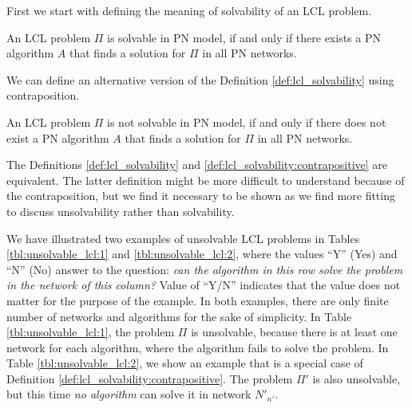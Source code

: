 First we start with defining the meaning of solvability of an LCL problem.
\begin{definition} \label{def:lcl_solvability}
    An LCL problem $\Pi$ is solvable in PN model, if and only if there exists a PN algorithm $A$ that finds a solution for $\Pi$ in all PN networks.
\end{definition}

We can define an alternative version of the Definition \ref{def:lcl_solvability} using contraposition.
\begin{definition} \label{def:lcl_solvability:contrapositive}
An LCL problem $\Pi$ is not solvable in PN model, if and only if there does not exist a PN algorithm $A$ that finds a solution for $\Pi$ in all PN networks.
\end{definition}



The Definitions \ref{def:lcl_solvability} and \ref{def:lcl_solvability:contrapositive} are equivalent. The latter definition might be more difficult to understand because of the contraposition, but we find it necessary to be shown as we find more fitting to discuss unsolvability rather than solvability.


We have illustrated two examples of unsolvable LCL problems in Tables \ref{tbl:unsolvable_lcl:1} and \ref{tbl:unsolvable_lcl:2}, where the values ``Y'' (Yes) and ``N'' (No) answer to the question: \emph{can the algorithm in this row solve the problem in the network of this column?}
Value of ``Y/N'' indicates that the value does not matter for the purpose of the example.
In both examples, there are only finite number of networks and algorithms for the sake of simplicity.
In Table \ref{tbl:unsolvable_lcl:1}, the problem $\Pi$ is unsolvable, because there is at least one network for each algorithm, where the algorithm fails to solve the problem.
In Table \ref{tbl:unsolvable_lcl:2}, we show an example that is a special case of Definition \ref{def:lcl_solvability:contrapositive}.
The problem $\Pi'$ is also unsolvable, but this time \emph{no algorithm} can solve it in network $N'_{n'}$.

